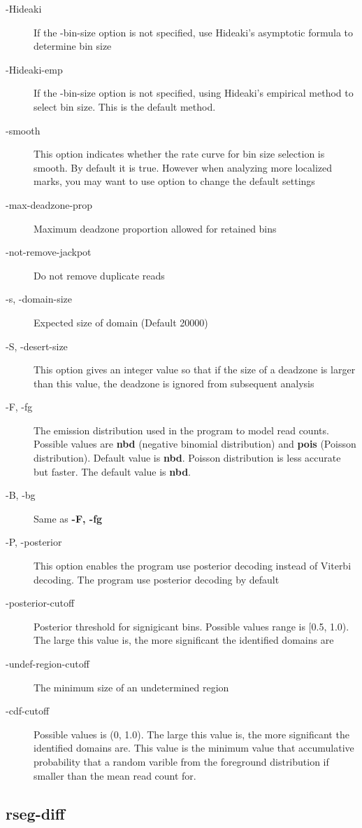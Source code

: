 \documentclass[11pt]{report}
\begin{document}
\begin{description}
\item[-Hideaki] If the -bin-size option is not specified, use
  Hideaki's asymptotic formula to determine bin size
\item[-Hideaki-emp] If the -bin-size option is not specified, using
  Hideaki's empirical method to select bin size. This is the default
  method.
\item[-smooth] This option indicates whether the rate curve for bin
  size selection is smooth. By default it is true. However when
  analyzing more localized marks, you may want to use option to change
  the default settings
\item[-max-deadzone-prop] Maximum deadzone proportion allowed for
  retained bins
\item[-not-remove-jackpot] Do not remove duplicate reads
\item[-s, -domain-size] Expected size of domain (Default 20000) 
\item[-S, -desert-size] This option gives an integer value so that if
  the size of a deadzone is larger than this value, the deadzone is
  ignored from subsequent analysis
\item[-F, -fg] The emission distribution used in the program to model
  read counts. Possible values are \textbf{nbd} (negative binomial
  distribution) and \textbf{pois} (Poisson distribution). Default
  value is \textbf{nbd}. Poisson distribution is less accurate but
  faster.  The default value is \textbf{nbd}.
\item[-B, -bg] Same as \textbf{-F, -fg} 
\item[-P, -posterior] This option enables the program use posterior
  decoding instead of Viterbi decoding. The program use posterior
  decoding by default
\item[-posterior-cutoff] Posterior threshold for signigicant
  bins. Possible values range is [0.5, 1.0). The large this value is,
  the more significant the identified domains are
\item[-undef-region-cutoff] The minimum size of an undetermined region
\item[-cdf-cutoff] Possible values is (0, 1.0). The large this value
  is, the more significant the identified domains are. This value is
  the minimum value that accumulative probability that a random
  varible from the foreground distribution if smaller than the mean
  read count for.
\end{description}

\subsection{rseg-diff}
\label{sec:rseg-diff-detail}
\end{document}
